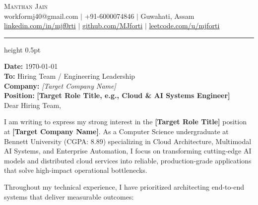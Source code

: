 \documentclass[letterpaper,10pt]{article}
\begin{document}
\begin{center}
  {\Huge \scshape Manthan Jain} \\[6pt]
  \small 
  workformj40@gmail.com \hspace{8pt}$|$\hspace{8pt} +91-6000074846 \hspace{8pt}$|$\hspace{8pt} Guwahati, Assam \\[3pt]
  \href{https://www.linkedin.com/in/mjf0rti}{linkedin.com/in/mjf0rti} \hspace{8pt}$|$\hspace{8pt} \href{https://github.com/MJforti}{github.com/MJforti} \hspace{8pt}$|$\hspace{8pt} \href{https://leetcode.com/u/mjforti_/}{leetcode.com/u/mjforti}
\end{center}

\vspace{-6pt}
\hrule height 0.5pt
\vspace{10pt}

\small
\textbf{Date:} \today \\[4pt]
\textbf{To:} Hiring Team / Engineering Leadership \\
\textbf{Company:} \textit{[Target Company Name]} \\
\textbf{Position:} \textbf{[Target Role Title, e.g., Cloud \& AI Systems Engineer]} \\[8pt]

Dear Hiring Team,

\vspace{4pt}
I am writing to express my strong interest in the \textbf{[Target Role Title]} position at \textbf{[Target Company Name]}. As a Computer Science undergraduate at Bennett University (CGPA: 8.89) specializing in Cloud Architecture, Multimodal AI Systems, and Enterprise Automation, I focus on transforming cutting-edge AI models and distributed cloud services into reliable, production-grade applications that solve high-impact operational bottlenecks.

Throughout my technical experience, I have prioritized architecting end-to-end systems that deliver measurable outcomes:
\end{document}
